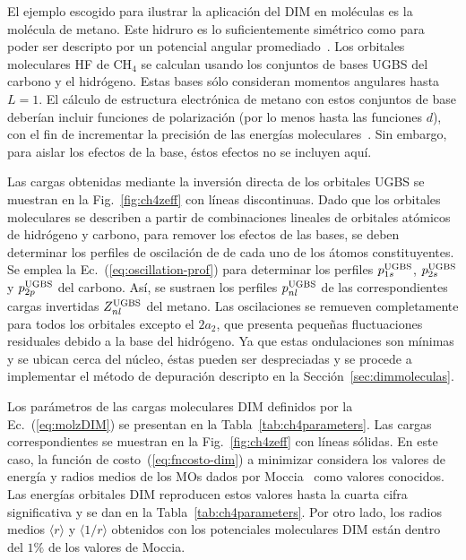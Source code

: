 El ejemplo escogido para ilustrar la aplicación del DIM en moléculas es 
la molécula de metano. Este hidruro es lo suficientemente simétrico 
como para poder ser descripto por un potencial angular 
promediado~\cite{Granados:16}. 
Los orbitales moleculares HF de CH$_4$ se calculan usando los conjuntos 
de bases UGBS del carbono y el hidrógeno. Estas bases sólo consideran 
momentos angulares hasta $L=1$. El cálculo de estructura electrónica de 
metano con estos conjuntos de base deberían incluir funciones de 
polarización (por lo menos hasta las funciones $d$), con el fin de 
incrementar la precisión de las energías moleculares~\cite{Rothenberg:71,
Hariharan:72}. Sin embargo, para aislar los efectos de la base, éstos 
efectos no se incluyen aquí. 

Las cargas obtenidas mediante la inversión directa de los orbitales UGBS 
se muestran en la Fig.~\ref{fig:ch4zeff} con líneas discontinuas. Dado 
que los orbitales moleculares se describen a partir de combinaciones 
lineales de orbitales atómicos de hidrógeno y carbono, para remover los 
efectos de las bases, se deben determinar los perfiles de oscilación de 
de cada uno de los átomos constituyentes. Se emplea la 
Ec.~(\ref{eq:oscillation-prof}) para determinar los perfiles 
$p_{1s}^{\mbox{\scriptsize UGBS}}$, $p_{2s}^{\mbox{\scriptsize UGBS}}$ y 
$p_{2p}^{\mbox{\scriptsize UGBS}}$ del carbono. Así, se sustraen los 
perfiles $p_{nl}^{\mbox{\scriptsize UGBS}}$ de las correspondientes 
cargas invertidas $Z_{nl}^{\mbox{\scriptsize UGBS}}$ del metano. Las 
oscilaciones se remueven completamente para todos los orbitales excepto 
el $2a_2$, que presenta pequeñas fluctuaciones residuales debido a la 
base del hidrógeno. Ya que estas ondulaciones son mínimas y se ubican 
cerca del núcleo, éstas pueden ser despreciadas y se procede a 
implementar el método de depuración descripto en la 
Sección~\ref{sec:dimmoleculas}. 

Los parámetros de las cargas moleculares DIM definidos por la 
Ec.~(\ref{eq:molzDIM}) se presentan en la Tabla~\ref{tab:ch4parameters}. 
Las cargas correspondientes se muestran en la Fig.~\ref{fig:ch4zeff} con 
líneas sólidas. En este caso, la función de costo~(\ref{eq:fncosto-dim}) 
a minimizar considera los valores de energía y radios medios de los 
MOs dados por Moccia~\cite{Moccia:69} como valores conocidos. Las 
energías orbitales DIM reproducen estos valores hasta la cuarta cifra 
significativa y se dan en la Tabla~\ref{tab:ch4parameters}. Por otro 
lado, los radios medios $\langle r\rangle$ y $\langle 1/r\rangle$ 
obtenidos con los potenciales moleculares DIM están dentro del $1\%$ de 
los valores de Moccia.

